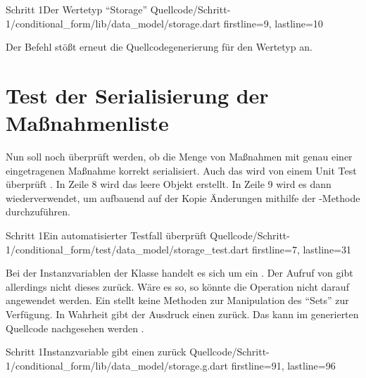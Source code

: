 \begin{alexlisting}{Schritt 1}{Der Wertetyp \enquote{Storage}}
  {Quellcode/Schritt-1/conditional_form/lib/data_model/storage.dart}
  {firstline=9, lastline=10}
  \label{lst:Schritt1WerteTypStorage}
\end{alexlisting}

Der Befehl   stößt erneut die Quellcodegenerierung für den Wertetyp  an.

\section{Test der Serialisierung der Maßnahmenliste}

Nun soll noch überprüft werden, ob die Menge von Maßnahmen mit genau einer eingetragenen Maßnahme korrekt serialisiert.
Auch das wird von einem Unit Test überprüft \Lst{\ref{lst:Schritt1MassnahmenSerialisierenOhneFehlerUnitTest}}.
In Zeile 8 wird das leere Objekt  erstellt.
In Zeile 9 wird es dann wiederverwendet, um aufbauend auf der Kopie Änderungen mithilfe der -Methode durchzuführen.

\begin{alexlisting}{Schritt 1}{Ein automatisierter Testfall überprüft}
  {Quellcode/Schritt-1/conditional_form/test/data_model/storage_test.dart}
  {firstline=7, lastline=31}
  \label{lst:Schritt1MassnahmenSerialisierenOhneFehlerUnitTest}
\end{alexlisting}

Bei der Instanzvariablen  der Klasse  handelt es sich um ein .
 Der Aufruf von   gibt allerdings nicht dieses  zurück.
 Wäre es so, so könnte die Operation  nicht  darauf angewendet werden.
 Ein  stellt keine Methoden zur Manipulation des \enquote{Sets} zur Verfügung.
 In Wahrheit gibt der Ausdruck  einen  zurück.
 Das kann im generierten Quellcode nachgesehen werden \LstZ{\ref{lst:Schritt1InstanzvariableMassnahmenGibtEinenSetBuilderZurueck}}.

\begin{alexlisting}{Schritt 1}{Instanzvariable  gibt einen  zurück}
  {Quellcode/Schritt-1/conditional_form/lib/data_model/storage.g.dart}
  {firstline=91, lastline=96}
  \label{lst:Schritt1InstanzvariableMassnahmenGibtEinenSetBuilderZurueck}
\end{alexlisting}

